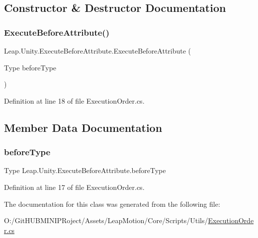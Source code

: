 \subsection{Constructor \& Destructor Documentation}
\mbox{\label{class_leap_1_1_unity_1_1_execute_before_attribute_afa564cc4ceb7b0896b1079ce1b7e9d93}} 
\subsubsection{\texorpdfstring{ExecuteBeforeAttribute()}{ExecuteBeforeAttribute()}}
{\footnotesize\ttfamily Leap.\+Unity.\+Execute\+Before\+Attribute.\+Execute\+Before\+Attribute (\begin{DoxyParamCaption}\item[{Type}]{before\+Type }\end{DoxyParamCaption})}



Definition at line 18 of file Execution\+Order.\+cs.



\subsection{Member Data Documentation}
\mbox{\label{class_leap_1_1_unity_1_1_execute_before_attribute_aea1b9b60c1c301e7878a7bfbc215beac}} 
\subsubsection{\texorpdfstring{beforeType}{beforeType}}
{\footnotesize\ttfamily Type Leap.\+Unity.\+Execute\+Before\+Attribute.\+before\+Type}



Definition at line 17 of file Execution\+Order.\+cs.



The documentation for this class was generated from the following file\+:\begin{DoxyCompactItemize}
\item 
O\+:/\+Git\+H\+U\+B\+M\+I\+N\+I\+P\+Roject/\+Assets/\+Leap\+Motion/\+Core/\+Scripts/\+Utils/\mbox{\hyperlink{_execution_order_8cs}{Execution\+Order.\+cs}}\end{DoxyCompactItemize}
